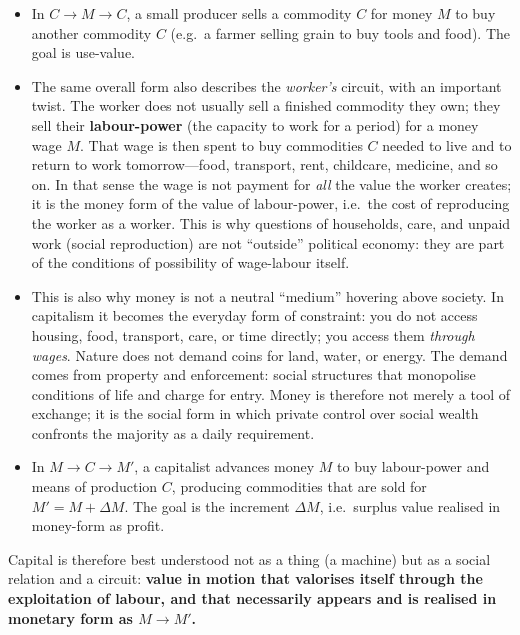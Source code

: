 \begin{itemize}[leftmargin=1.5em]
  \item In $C \rightarrow M \rightarrow C$, a small producer sells a commodity $C$ for money $M$ to buy another
  commodity $C$ (e.g.\ a farmer selling grain to buy tools and food). The goal is use-value.

  \item The same overall form also describes the \emph{worker's} circuit, with an important twist. The worker
  does not usually sell a finished commodity they own; they sell their \textbf{labour-power} (the capacity to
  work for a period) for a money wage $M$. That wage is then spent to buy commodities $C$ needed to live and to
  return to work tomorrow---food, transport, rent, childcare, medicine, and so on. In that sense the wage is not
  payment for \emph{all} the value the worker creates; it is the money form of the value of labour-power, i.e.\
  the cost of reproducing the worker as a worker. This is why questions of households, care, and unpaid work
  (social reproduction) are not ``outside'' political economy: they are part of the conditions of possibility of
  wage-labour itself.

    \item This is also why money is not a neutral ``medium'' hovering above society. In capitalism it
  becomes the everyday form of constraint: you do not access housing, food, transport, care, or time
  directly; you access them \emph{through wages}. Nature does not demand coins for land, water, or
  energy. The demand comes from property and enforcement: social structures that monopolise conditions
  of life and charge for entry. Money is therefore not merely a tool of exchange; it is the social form
  in which private control over social wealth confronts the majority as a daily requirement.


  \item In $M \rightarrow C \rightarrow M'$, a capitalist advances money $M$ to buy labour-power and means of
  production $C$, producing commodities that are sold for $M' = M + \Delta M$. The goal is the increment
  $\Delta M$, i.e.\ surplus value realised in money-form as profit.
\end{itemize}

Capital is therefore best understood not as a thing (a machine) but as a social relation and a circuit:
\textbf{value in motion that valorises itself through the exploitation of labour, and that necessarily appears
and is realised in monetary form as $M \rightarrow M'$.}


